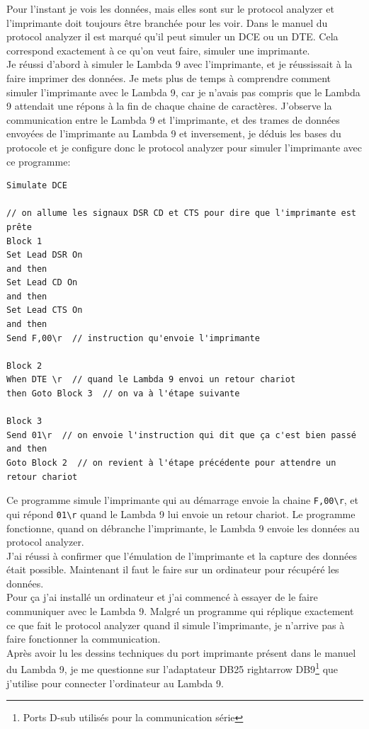 \documentclass[12pt]{article}
\begin{document}
Pour l'instant je vois les données, mais elles sont sur le protocol analyzer et l'imprimante doit toujours être branchée pour les voir.
Dans le manuel du protocol analyzer il est marqué qu'il peut simuler un DCE ou un DTE.
Cela correspond exactement à ce qu'on veut faire, simuler une imprimante.\\
Je réussi d'abord à simuler le Lambda 9 avec l'imprimante, et je réussissait à la faire imprimer des données.
Je mets plus de temps à comprendre comment simuler l'imprimante avec le Lambda 9, car je n'avais pas compris que le Lambda 9 attendait une répons à la fin de chaque chaine de caractères.
J'observe la communication entre le Lambda 9 et l'imprimante, et des trames de données envoyées de l'imprimante au Lambda 9 et inversement, je déduis les bases du protocole et je configure donc le protocol analyzer pour simuler l'imprimante avec ce programme:
\FloatBarrier
\begin{lstlisting}
Simulate DCE

// on allume les signaux DSR CD et CTS pour dire que l'imprimante est prête
Block 1
Set Lead DSR On
and then
Set Lead CD On
and then
Set Lead CTS On
and then
Send F,00\r  // instruction qu'envoie l'imprimante

Block 2
When DTE \r  // quand le Lambda 9 envoi un retour chariot
then Goto Block 3  // on va à l'étape suivante

Block 3
Send 01\r  // on envoie l'instruction qui dit que ça c'est bien passé
and then
Goto Block 2  // on revient à l'étape précédente pour attendre un retour chariot
\end{lstlisting}
Ce programme simule l'imprimante qui au démarrage envoie la chaine \verb|F,00\r|, et qui répond \verb|01\r| quand le Lambda 9 lui envoie un retour chariot.
Le programme fonctionne, quand on débranche l'imprimante, le Lambda 9 envoie les données au protocol analyzer.\\
J'ai réussi à confirmer que l'émulation de l'imprimante et la capture des données était possible.
Maintenant il faut le faire sur un ordinateur pour récupéré les données.\\
Pour ça j'ai installé un ordinateur et j'ai commencé à essayer de le faire communiquer avec le Lambda 9.
Malgré un programme qui réplique exactement ce que fait le protocol analyzer quand il simule l'imprimante, je n'arrive pas à faire fonctionner la communication.\\
Après avoir lu les dessins techniques du port imprimante présent dans le manuel du Lambda 9, je me questionne sur l'adaptateur DB25 rightarrow DB9\footnote{Ports D-sub utilisés pour la communication série} que j'utilise pour connecter l'ordinateur au Lambda 9.\\
\end{document}
